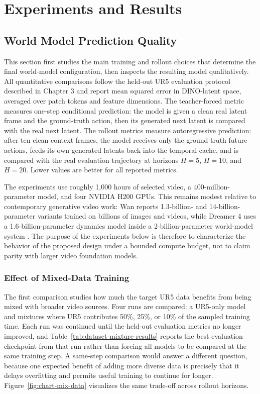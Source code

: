 \documentclass[12pt]{report}
\begin{document}
\chapter{Experiments and Results}

\section{World Model Prediction Quality}
This section first studies the main training and rollout choices that determine the final world-model configuration, then inspects the resulting model qualitatively. All quantitative comparisons follow the held-out UR5 evaluation protocol described in Chapter 3 and report mean squared error in DINO-latent space, averaged over patch tokens and feature dimensions. The teacher-forced metric measures one-step conditional prediction: the model is given a clean real latent frame and the ground-truth action, then its generated next latent is compared with the real next latent. The rollout metrics measure autoregressive prediction: after ten clean context frames, the model receives only the ground-truth future actions, feeds its own generated latents back into the temporal cache, and is compared with the real evaluation trajectory at horizons $H=5$, $H=10$, and $H=20$. Lower values are better for all reported metrics.

The experiments use roughly 1{,}000 hours of selected video, a 400-million-parameter model, and four NVIDIA H200 GPUs. This remains modest relative to contemporary generative video work: Wan reports 1.3-billion- and 14-billion-parameter variants trained on billions of images and videos, while Dreamer 4 uses a 1.6-billion-parameter dynamics model inside a 2-billion-parameter world-model system \cite{wan2025wan,hafner2025dreamerv4}. The purpose of the experiments below is therefore to characterize the behavior of the proposed design under a bounded compute budget, not to claim parity with larger video foundation models.

\subsection{Effect of Mixed-Data Training}
The first comparison studies how much the target UR5 data benefits from being mixed with broader video sources. Four runs are compared: a UR5-only model and mixtures where UR5 contributes 50\%, 25\%, or 10\% of the sampled training time. Each run was continued until the held-out evaluation metrics no longer improved, and Table~\ref{tab:dataset-mixture-results} reports the best evaluation checkpoint from that run rather than forcing all models to be compared at the same training step. A same-step comparison would answer a different question, because one expected benefit of adding more diverse data is precisely that it delays overfitting and permits useful training to continue for longer. Figure~\ref{fig:chart-mix-data} visualizes the same trade-off across rollout horizons.
\end{document}
